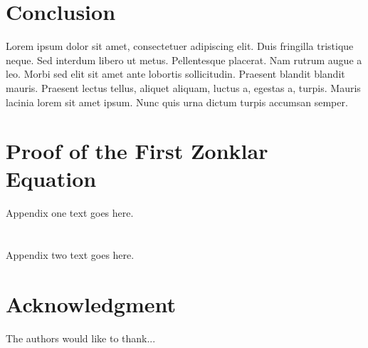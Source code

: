 \documentclass[journal]{IEEEtran}
\begin{document}
\section{Conclusion}
Lorem ipsum dolor sit amet, consectetuer adipiscing elit.
Duis fringilla tristique neque. Sed interdum libero ut metus. Pellentesque placerat. Nam rutrum augue a leo.
Morbi sed elit sit amet ante lobortis sollicitudin. Praesent blandit blandit mauris. Praesent lectus tellus,
aliquet aliquam, luctus a, egestas a, turpis. Mauris lacinia lorem sit amet ipsum. Nunc quis urna dictum
turpis accumsan semper.


\appendices
\section{Proof of the First Zonklar Equation}
Appendix one text goes here.

\section{}
Appendix two text goes here.


\section*{Acknowledgment}


The authors would like to thank...


\ifCLASSOPTIONcaptionsoff
  \newpage
\fi





%
%
%


\end{document}
